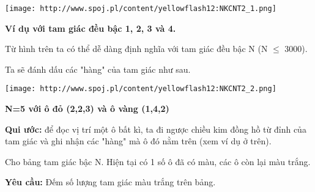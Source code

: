 \texttt{[image: http://www.spoj.pl/content/yellowflash12:NKCNT2\_1.png]}

\textbf{    Ví dụ với tam giác đều bậc 1, 2, 3 và 4.   }

   Từ hình trên ta có thể dễ dàng định nghĩa với tam giác đều bậc N (N  $\le$  3000).  

   Ta sẽ đánh dấu các "hàng" của tam giác như sau.  


\texttt{[image: http://www.spoj.pl/content/yellowflash12:NKCNT2\_2.png]}

\textbf{    N=5 với ô đỏ (2,2,3) và ô vàng (1,4,2)   }

\textbf{    Qui ước:   }   để đọc vị trí một ô bất kì, ta đi ngược chiều kim đồng hồ từ đỉnh của tam giác và ghi nhận các "hàng" mà ô đó nằm trên (xem ví dụ ở trên).  

   Cho bảng tam giác bậc N. Hiện tại có 1 số ô đã có màu, các ô còn lại màu trắng.  

\textbf{    Yêu cầu:   }   Đếm số lượng tam giác màu trắng trên bảng.